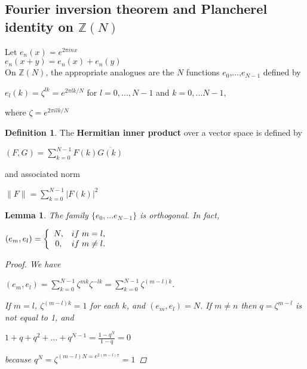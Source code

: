 \documentclass[psamsfonts]{amsart}
\newtheorem{lem}[thm]{Lemma}
\theoremstyle{definition}
\newtheorem{defn}[thm]{Definition}
\theoremstyle{remark}
\numberwithin{equation}{section}
\begin{document}
		\subsection{Fourier inversion theorem and Plancherel identity on $\mathbb{Z}(N)$}
			Let $e_n(x) = e^{2\pi inx}$\\
			$e_n(x+y) = e_n(x)+e_n(y)$\\
			On $\mathbb{Z}(N)$, the appropriate analogues are the $N$ functions $e_0$,...,$e_{N-1}$ defined by\\
			
			\begin{center}
				$e_l(k) = \zeta ^{lk} = e^{2\pi lk/N}$ for $l = 0,...,N-1$ and $k = 0,...N-1$,			
			\end{center}
			\vspace{2mm}
			where $\zeta = e^{2\pi ilk/N}$
			
			\begin{defn}
				The \textbf{Hermitian inner product} over a vector space is defined by
				\begin{center}
					$(F,G) = \sum_{k=0}^{N-1} F(k)\overline{G(k)}$
				\end{center}	
				and associated norm 
				\begin{center}
					$\|F\| = \sum_{k=0}^{N-1} |F(k)|^2$
				\end{center}
			\end{defn}
			
			\begin{lem}
				The family $\{e_0,...e_{N-1} \}$ is orthogonal. In fact,\\
				\begin{center}
					$(e_m,e_l)=\left\{\begin{array}{cl}
								N, & if \hspace{1mm} m=l,\\
								0, & if \hspace{1mm} m\neq l.
									\end{array}\right.
					$
				\end{center}
				
				\begin{proof}
					We have\\
					\begin{center}
						$
					(e_m,e_l)=\sum_{k=0}^{N-1} \zeta ^{mk} \zeta^{-lk}=\sum_{k=0}^{N-1} \zeta ^{(m-l)k}.			
						$
					\end{center}
					\vspace{2mm}
					If $m=l$, $\zeta ^{(m-l)k}=1$ for each $k$, and $(e_m,e_l)=N$. If $m\neq n$ then $q=\zeta ^{m-l}$ is not equal to 1, and\\
					
					\begin{center}
						$1+q+q^2+...+q^{N-1}=\frac{1-q^N}{1-q}=0$
					\end{center}
					\vspace{2mm}
					because $q^N=\zeta ^{(m-l)N=e^{2(m-l)\pi}}=1$
				\end{proof}
			\end{lem}
			
\end{document}
